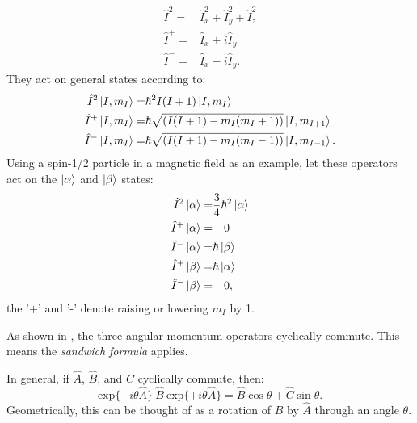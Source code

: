 \begin{align}
  \hat{I}^2 =& \hat{I}_x^2 + \hat{I}_y^2 + \hat{I}_z^2\\
  \hat{I}^+ =& \hat{I}_x + i\hat{I}_y\\
  \hat{I}^- =& \hat{I}_x - i\hat{I}_y.
\end{align}
They act on general states according to:
\begin{align}
  \hat{I}^2\ket{I,m_I} =& \hbar^2I(I+1)\ket{I, m_I}\\
  \hat{I}^+\ket{I,m_I} =& \hbar\sqrt{(I(I+1)-m_I(m_I+1))}\ket{I,m_{I+1}}\\
  \hat{I}^-\ket{I,m_I} =& \hbar\sqrt{(I(I+1)-m_I(m_I-1))}\ket{I,m_{I-1}}.
\end{align}
Using a spin-1/2 particle in a magnetic field as an example, let these operators act on the $\ket{\alpha}$ and $\ket{\beta}$ states:
\begin{align}
  \hat{I}^2\ket{\alpha} =& \frac{3}{4}\hbar^2\ket{\alpha}\\
  \hat{I}^+\ket{\alpha} =&\quad0\\
  \hat{I}^-\ket{\alpha} =& \hbar\ket{\beta}\\
  \hat{I}^+\ket{\beta} =& \hbar\ket{\alpha}\\
  \hat{I}^-\ket{\beta} =&\quad0,
\end{align}
the '+' and '-' denote raising or lowering $m_I$ by 1.

As shown in , the three angular momentum operators cyclically
commute. This means the \textit{sandwich formula} applies.

In general, if $\hat{A}$, $\hat{B}$, and $\hat{C}$ cyclically commute, then:
\begin{equation}
  \text{exp}\{-i\theta\hat{A}\}\:\hat{B}\:\text{exp}\{+i\theta\hat{A}\} = \hat{B}\cos{\theta} + \hat{C}\sin{\theta}.
\end{equation}
Geometrically, this can be thought of as a rotation of $\hat{B}$ by $\hat{A}$ through
an angle $\theta$.

